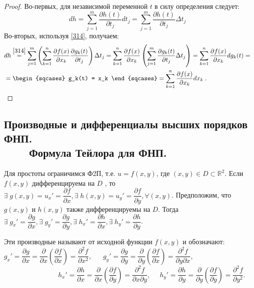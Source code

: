\begin{proof}
	Во-первых, для независимой переменной $t$ в силу определения следует:\\
    \begin{equation*}
        dh = \sum\limits_{j=1}^{m} \dfrac{\partial h(t)}{\partial t_j} dt_j = \sum\limits_{j=1}^{m}  \dfrac{\partial h(t)}{\partial t_j} \Delta t_j
    \end{equation*}
	Во-вторых, используя \eqref{314}, получаем:\\
    \begin{align*}
        & dh \overset{\eqref{314}}{=} \sum\limits_{j=1}^{m} \left( \sum\limits_{k=1}^{n} \dfrac{\partial f(x)}{\partial x_k} \dfrac{\partial g_k(t)}{\partial t_j} \right) \Delta t_j = \sum\limits_{k=1}^{n}  \dfrac{\partial f(x)}{\partial x_k} \left( \sum\limits_{j=1}^{m} \dfrac{\partial g_k(t)}{\partial t_j} \Delta t_j \right) = \sum\limits_{k=1}^{n}  \dfrac{\partial f(x)}{\partial x_k} d g_k(t) =  \\
        & = \begin{sqcases} g_k(t) = x_k \end{sqcases} = \sum\limits_{k=1}^{n} \dfrac{\partial f(x)}{\partial x_k} dx_k \; .
    \end{align*}
\end{proof}

\subsection{Производные и дифференциалы высших порядков ФНП. \\ $ \text{ } \;\;\;\;\; $ Формула Тейлора для ФНП.}

Для простоты ограничимся Ф2П, т.е. $ u = f(x, y) $, где $ (x, y) \in D \subset \mathbb{R}^2 $. Если $ f(x, y) $ дифференцируема на $ D $ , то  $ \exists \; g(x, y) = u_x ' = \dfrac{\partial f}{\partial x}, \exists \; h(x,y) = u_y ' =  \dfrac{\partial f}{\partial y}, \forall (x, y)$.
Предположим, что $ g(x, y) $ и $ h(x, y) $ также дифференцируемы на $ D $. 
Тогда $ \exists \; g_x' = \dfrac{\partial g}{\partial x}, \exists \; g_y' = \dfrac{\partial g}{\partial y}, \exists \; h_x' = \dfrac{\partial h}{\partial x}, \exists \; h_y' = \dfrac{\partial h}{\partial y} $.

Эти производные называют  от исходной функции $ f(x, y) $ и обозначают: 
$ \;\;\;\; $
$ g_x' = \dfrac{\partial g}{\partial x} = \dfrac{\partial}{\partial x} \left( \dfrac{\partial f}{\partial x} \right) = \dfrac{\partial^2 f}{\partial x^2} $,
$  \;\;\;\; $
$ g_y' = \dfrac{\partial g}{\partial y} = \dfrac{\partial}{\partial y} \left( \dfrac{\partial f}{\partial x} \right) = \dfrac{\partial^2 f}{\partial y \partial x} $,\\
 $ \text{ } \;\;\;\;\;\;\; $ 
 $ \text{ } \;\;\;\;\;\;\;\;\; $
 $ \;\;\;\; $
 $ h_x' = \dfrac{\partial h}{\partial x} = \dfrac{\partial}{\partial x} \left( \dfrac{\partial f}{\partial y} \right) = \dfrac{\partial^2 f}{\partial x \partial y} $,
$  \;\;\; $
 $ h_y' = \dfrac{\partial h}{\partial y} = \dfrac{\partial}{\partial y} \left( \dfrac{\partial f}{\partial y} \right) = \dfrac{\partial^2 f}{\partial y^2} $.
 
